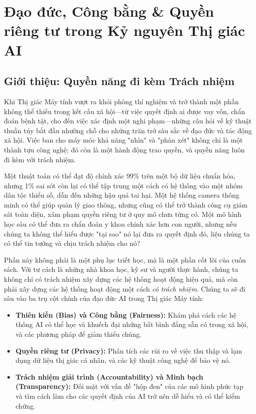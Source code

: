 \section{Đạo đức, Công bằng \& Quyền riêng tư trong Kỷ nguyên Thị giác AI}
\label{sec:ethics_fairness_privacy}

\subsection{Giới thiệu: Quyền năng đi kèm Trách nhiệm}
\label{subsec:ethics_intro}

Khi Thị giác Máy tính vượt ra khỏi phòng thí nghiệm và trở thành một phần không thể thiếu trong kết cấu xã hội—từ việc quyết định ai được vay vốn, chẩn đoán bệnh tật, cho đến việc xác định một nghi phạm—những câu hỏi về kỹ thuật thuần túy bắt đầu nhường chỗ cho những trăn trở sâu sắc về đạo đức và tác động xã hội. Việc ban cho máy móc khả năng "nhìn" và "phán xét" không chỉ là một thành tựu công nghệ; đó còn là một hành động trao quyền, và quyền năng luôn đi kèm với trách nhiệm.

Một thuật toán có thể đạt độ chính xác 99\% trên một bộ dữ liệu chuẩn hóa, nhưng 1\% sai sót còn lại có thể tập trung một cách có hệ thống vào một nhóm dân tộc thiểu số, dẫn đến những hậu quả tai hại. Một hệ thống camera thông minh có thể giúp quản lý giao thông, nhưng cũng có thể trở thành công cụ giám sát toàn diện, xâm phạm quyền riêng tư ở quy mô chưa từng có. Một mô hình học sâu có thể đưa ra chẩn đoán y khoa chính xác hơn con người, nhưng nếu chúng ta không thể hiểu được "tại sao" nó lại đưa ra quyết định đó, liệu chúng ta có thể tin tưởng và chịu trách nhiệm cho nó?

Phần này không phải là một phụ lục triết học, mà là một phần cốt lõi của cuốn sách. Với tư cách là những nhà khoa học, kỹ sư và người thực hành, chúng ta không chỉ có trách nhiệm xây dựng các hệ thống hoạt động hiệu quả, mà còn phải xây dựng các hệ thống hoạt động một cách \textit{có trách nhiệm}. Chúng ta sẽ đi sâu vào ba trụ cột chính của đạo đức AI trong Thị giác Máy tính:
\begin{itemize}
    \item \textbf{Thiên kiến (Bias) và Công bằng (Fairness):} Khám phá cách các hệ thống AI có thể học và khuếch đại những bất bình đẳng sẵn có trong xã hội, và các phương pháp để giảm thiểu chúng.
    \item \textbf{Quyền riêng tư (Privacy):} Phân tích các rủi ro về việc thu thập và lạm dụng dữ liệu thị giác cá nhân, và các kỹ thuật công nghệ để bảo vệ nó.
    \item \textbf{Trách nhiệm giải trình (Accountability) và Minh bạch (Transparency):} Đối mặt với vấn đề "hộp đen" của các mô hình phức tạp và tìm cách làm cho các quyết định của AI trở nên dễ hiểu và có thể kiểm chứng.
\end{itemize}

